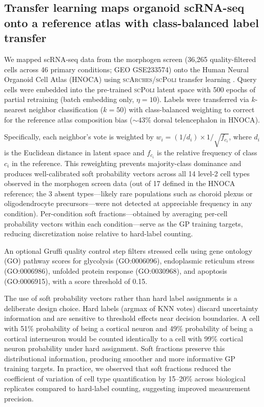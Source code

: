 \documentclass[times,twoside]{zHenriquesLab-StyleBioRxiv}
\newcommand{\hnoca}{\textsc{HNOCA}}
\newcommand{\scpoli}{\textsc{scPoli}}
\newcommand{\scarches}{\textsc{scArches}}
\begin{document}
\subsection*{Transfer learning maps organoid scRNA-seq onto a reference atlas with class-balanced label transfer}

We mapped scRNA-seq data from the morphogen screen (36,265 quality-filtered cells across 46 primary conditions; GEO GSE233574) onto the Human Neural Organoid Cell Atlas (\hnoca{}) \cite{He2024hnoca} using \scarches{}/\scpoli{} transfer learning \cite{Lotfollahi2022scarches, DeDonno2023scpoli}. Query cells were embedded into the pre-trained \scpoli{} latent space with 500 epochs of partial retraining (batch embedding only, $\eta{=}10$). Labels were transferred via $k$-nearest neighbor classification ($k{=}50$) with class-balanced weighting to correct for the reference atlas composition bias (${\sim}43\%$ dorsal telencephalon in \hnoca{}).

Specifically, each neighbor's vote is weighted by $w_i = (1/d_i) \times 1/\sqrt{f_{c_i}}$, where $d_i$ is the Euclidean distance in latent space and $f_{c_i}$ is the relative frequency of class $c_i$ in the reference. This reweighting prevents majority-class dominance and produces well-calibrated soft probability vectors across all 14 level-2 cell types observed in the morphogen screen data (out of 17 defined in the HNOCA reference; the 3 absent types---likely rare populations such as choroid plexus or oligodendrocyte precursors---were not detected at appreciable frequency in any condition). Per-condition soft fractions---obtained by averaging per-cell probability vectors within each condition---serve as the GP training targets, reducing discretization noise relative to hard-label counting.

An optional Gruffi quality control step \cite{Vertesy2022gruffi} filters stressed cells using gene ontology (GO) pathway scores for glycolysis (GO:0006096), endoplasmic reticulum stress (GO:0006986), unfolded protein response (GO:0030968), and apoptosis (GO:0006915), with a score threshold of 0.15.

The use of soft probability vectors rather than hard label assignments is a deliberate design choice. Hard labels (argmax of KNN votes) discard uncertainty information and are sensitive to threshold effects near decision boundaries. A cell with 51\% probability of being a cortical neuron and 49\% probability of being a cortical interneuron would be counted identically to a cell with 99\% cortical neuron probability under hard assignment. Soft fractions preserve this distributional information, producing smoother and more informative GP training targets. In practice, we observed that soft fractions reduced the coefficient of variation of cell type quantification by 15--20\% across biological replicates compared to hard-label counting, suggesting improved measurement precision.
\end{document}
